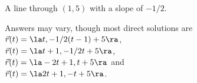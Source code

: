 {A line through $(1,5)$ with a slope of $-1/2$. 
}
{
Answers may vary, though most direct solutions are \\
$\vec r(t) = \la t,-1/2(t-1)+5\ra $,\\
$\vec r(t) = \la t+1,-1/2t+5\ra $, \\
$\vec r(t) = \la -2t+1,t+5\ra$ and \\
$\vec r(t) = \la 2t+1,-t+5\ra$.

}

